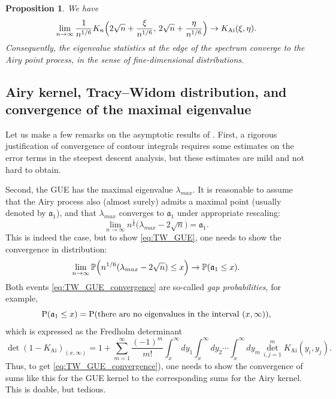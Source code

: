 \documentclass[letterpaper,11pt,oneside,reqno]{article}
\numberwithin{equation}{section}
\newcommand{\ssp}{\hspace{1pt}}
\newtheorem{proposition}{Proposition}[section]
\theoremstyle{definition}
\begin{document}
\begin{proposition}
	\label{prop:edge}
	We have
	\begin{equation*}
		\lim_{n\to\infty}
		\frac{1}{n^{1/6}}K_n\Bigl(2\sqrt{n}+\frac{\xi}{n^{1/6}},\,2\sqrt{n}+\frac{\eta}{n^{1/6}}\Bigr)
		\to
		K_{\mathrm{Ai}}(\xi,\eta).
	\end{equation*}
	Consequently, the eigenvalue statistics at the edge of the spectrum converge to the Airy point process, in the sense of fine-dimensional distributions.
\end{proposition}

\subsection{Airy kernel, Tracy--Widom distribution, and convergence of the maximal
eigenvalue}

Let us make a few remarks on the asymptotic results of
.
First,
a rigorous justification of convergence
of contour integrals requires some estimates on the error terms
in the steepest descent analysis, but these
estimates are mild and not hard to obtain.

Second, the GUE has the maximal eigenvalue $\lambda_{max}$. It is reasonable
to assume that the Airy process also (almost surely) admits a maximal point
(usually denoted by $\mathfrak{a}_1$),
and that $\lambda_{max}$
converges to $\mathfrak{a}_1$ under appropriate rescaling:
\begin{equation}
	\label{eq:TW_GUE}
	\lim_{n\to\infty}n^{\frac{1}{6}}\bigl(\lambda_{max}-2\sqrt{n}\bigr)=\mathfrak{a}_1.
\end{equation}
This is indeed the case, but to show \eqref{eq:TW_GUE}, one needs to
show the convergence in distribution:
\begin{equation}
	\label{eq:TW_GUE_convergence}
	\lim_{n\to \infty}
	\mathbb{P}\Bigl(n^{1/6}(\lambda_{max}-2\sqrt{n})\le x\Bigr)
	\to
	\mathbb{P}(\mathfrak{a}_1\le x).
\end{equation}
Both events \eqref{eq:TW_GUE_convergence} are so-called
\emph{gap probabilities}, for example,
\begin{equation*}
	\operatorname{P}(\mathfrak{a}_1\le x)=
	\operatorname{P}(\textnormal{there are no eigenvalues in the interval $(x,\infty)$}),
\end{equation*}
which is expressed as
the Fredholm determinant
\begin{equation}
	\label{eq:gap-probability-Ai-Fredholm}
	\det\left( 1-K_{\mathrm{Ai}} \right)_{(x,\infty)}=
	1+\sum_{m=1}^{\infty}\frac{(-1)^m}{m!}
	\int_x^{\infty}dy_1\int_x^{\infty}dy_2\cdots
	\int_x^{\infty}dy_m
	\ssp
	\det\limits_{i,j=1}^m
	K_{\mathrm{Ai}}(y_i,y_j).
\end{equation}
Thus, to get \eqref{eq:TW_GUE_convergence}), one needs to show the convergence
of sums like this for the GUE kernel
to the corresponding sums for the Airy kernel. This is doable, but tedious.
\end{document}
